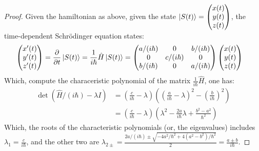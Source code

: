 \documentclass{article}
\begin{document}
\begin{proof}
    Given the hamiltonian as above, given the state $\ket{S(t)} = \begin{pmatrix}
        x(t)\\y(t)\\z(t)
    \end{pmatrix}$, the time-dependent Schr\"odinger equation states:
    \begin{align}
        \begin{pmatrix}
            x'(t)\\y'(t)\\z'(t)
        \end{pmatrix}&=\frac{\partial}{\partial t}\ket{S(t)}=\frac{1}{i\hbar}\hat{H}\ket{S(t)} = \begin{pmatrix}
            a/(i\hbar)&0&b/(i\hbar)\\0&c/(i\hbar)&0\\b/(i\hbar)&0&a/(i\hbar)
        \end{pmatrix}\begin{pmatrix}
            x(t)\\y(t)\\z(t)
        \end{pmatrix}
    \end{align}
    Which, compute the characeristic polynomial of the matrix $\frac{1}{i\hbar}\hat{H}$, one has:
    \begin{align}
        \det(\hat{H}/(i\hbar)-\lambda I) &= \left(\frac{c}{i\hbar}-\lambda\right)\left(\left(\frac{a}{i\hbar}-\lambda\right)^2-\left(\frac{b}{i\hbar}\right)^2\right)\\
        &= \left(\frac{c}{i\hbar}-\lambda\right)\left(\lambda^2 - \frac{2a}{i\hbar}\lambda + \frac{b^2-a^2}{\hbar^2}\right)
    \end{align}
    Which, the roots of the characteristic polynomials (or, the eigenvalues) includes $\lambda_1 = \frac{c}{i\hbar}$, and the other two are $\lambda_{2\pm} = \frac{2a/(i\hbar) \pm \sqrt{-4a^2/\hbar^2 + 4(a^2-b^2)/\hbar^2}}{2} = \frac{a\pm b}{i\hbar}$.

    \hfil


\end{proof}
\end{document}
